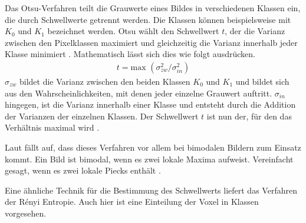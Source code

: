 Das Otsu-Verfahren teilt die Grauwerte eines Bildes in verschiedenen Klassen ein,
die durch Schwellwerte getrennt werden. Die Klassen können beispielsweise mit
$K_{0}$ und $K_{1}$ bezeichnet werden. Otsu wählt den Schwellwert $t$, der die
Varianz zwischen den Pixelklassen maximiert und gleichzeitig die Varianz
innerhalb jeder Klasse minimiert \citep[vgl.][S.~264]{lehmann2013bildverarbeitung}.
Mathematisch lässt sich dies wie folgt ausdrücken.
\begin{align}
	t = \text{max }(\sigma_{zw}^{2}/ \sigma_{in}^{2})
\end{align}
$\sigma_{zw}$ bildet die Varianz zwischen den beiden Klassen $K_{0}$ und $K_{1}$
und bildet sich aus den Wahrscheinlichkeiten, mit denen jeder einzelne Grauwert
auftritt. $\sigma_{in}$ hingegen, ist die Varianz innerhalb einer Klasse und
entsteht durch die Addition der Varianzen der einzelnen Klassen. Der Schwellwert
$t$ ist nun der, für den das Verhältnis maximal wird \citep[vgl.][S.~264]{lehmann2013bildverarbeitung}.

Laut \citet[S.~264]{lehmann2013bildverarbeitung} fällt auf, dass dieses Verfahren
vor allem bei bimodalen Bildern zum Einsatz kommt. Ein Bild ist bimodal, wenn es
zwei lokale Maxima aufweist. Vereinfacht gesagt, wenn es zwei lokale Piecks enthält
\citep[vgl.][S.~264]{lehmann2013bildverarbeitung}.

Eine ähnliche Technik für die Bestimmung des Schwellwerts liefert das Verfahren
der Rényi Entropie. Auch hier ist eine Einteilung der Voxel in Klassen vorgesehen.

\pagebreak


